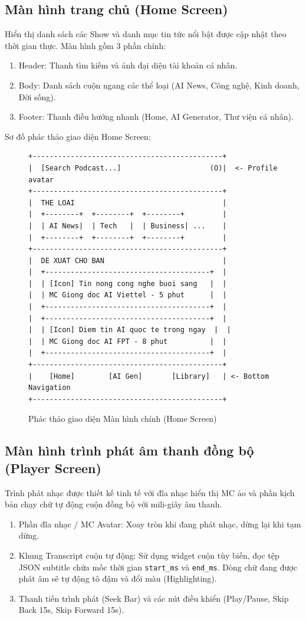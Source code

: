 \documentclass[12pt,a4paper]{report}
\begin{document}
\subsection{Màn hình trang chủ (Home Screen)}
Hiển thị danh sách các Show và danh mục tin tức nổi bật được cập nhật theo thời gian thực.
Màn hình gồm 3 phần chính:
\begin{enumerate}
    \item Header: Thanh tìm kiếm và ảnh đại diện tài khoản cá nhân.
    \item Body: Danh sách cuộn ngang các thể loại (AI News, Công nghệ, Kinh doanh, Đời sống).
    \item Footer: Thanh điều hướng nhanh (Home, AI Generator, Thư viện cá nhân).
\end{enumerate}

Sơ đồ phác thảo giao diện Home Screen:
\begin{figure}[h!]
\centering
\begin{lstlisting}
+---------------------------------------------+
|  [Search Podcast...]                     (O)|  <- Profile avatar
+---------------------------------------------+
|  THE LOAI                                   |
|  +--------+  +--------+  +--------+         |
|  | AI News|  | Tech   |  | Business| ...    |
|  +--------+  +--------+  +--------+         |
+---------------------------------------------+
|  DE XUAT CHO BAN                            |
|  +---------------------------------------+  |
|  | [Icon] Tin nong cong nghe buoi sang   |  |
|  | MC Giong doc AI Viettel - 5 phut      |  |
|  +---------------------------------------+  |
|  +---------------------------------------+  |
|  | [Icon] Diem tin AI quoc te trong ngay  |  |
|  | MC Giong doc AI FPT - 8 phut          |  |
|  +---------------------------------------+  |
+---------------------------------------------+
|    [Home]        [AI Gen]       [Library]   | <- Bottom Navigation
+---------------------------------------------+
\end{lstlisting}
\caption{Phác thảo giao diện Màn hình chính (Home Screen)}
\label{fig:ui_home}
\end{figure}

\subsection{Màn hình trình phát âm thanh đồng bộ (Player Screen)}
Trình phát nhạc được thiết kế tinh tế với đĩa nhạc hiển thị MC ảo và phần kịch bản chạy chữ tự động cuộn đồng bộ với mili-giây âm thanh.
\begin{enumerate}
    \item Phần đĩa nhạc / MC Avatar: Xoay tròn khi đang phát nhạc, dừng lại khi tạm dừng.
    \item Khung Transcript cuộn tự động: Sử dụng widget cuộn tùy biến, đọc tệp JSON subtitle chứa mốc thời gian \texttt{start\_ms} và \texttt{end\_ms}. Dòng chữ đang được phát âm sẽ tự động tô đậm và đổi màu (Highlighting).
    \item Thanh tiến trình phát (Seek Bar) và các nút điều khiển (Play/Pause, Skip Back 15s, Skip Forward 15s).
\end{enumerate}
\end{document}
